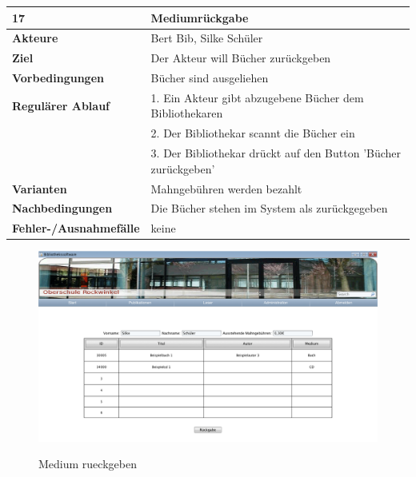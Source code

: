 \documentclass[fontsize=12pt,paper=a4,twoside]{scrartcl}
\begin{document}
\begin{table}[htbp]
\label{17}
\begin{tabular}{|l|p{10cm}|}
\hline 
\textbf{17} & \textbf{Mediumrückgabe} \\ \hline
\textbf{Akteure} & Bert Bib, Silke Schüler\\ \hline
\textbf{Ziel} & Der Akteur will Bücher zurückgeben \\ \hline
\textbf{Vorbedingungen} & Bücher sind ausgeliehen \\ \hline
\textbf{Regulärer Ablauf} & 
1. Ein Akteur gibt abzugebene Bücher dem Bibliothekaren \\
&2. Der Bibliothekar scannt die Bücher ein\\
&3. Der Bibliothekar drückt auf den Button 'Bücher zurückgeben'\\
\hline
\textbf{Varianten} & 
Mahngebühren werden bezahlt \\ \hline
\textbf{Nachbedingungen} & Die Bücher stehen im System als zurückgegeben\\ \hline
\textbf{Fehler-/Ausnahmefälle} & keine\\
\hline
\end{tabular}
\end{table}

\begin{figure}[htbp]
\caption{Medium rueckgeben}
\includegraphics[width=1\textwidth]{ScreensWebsite/Rueckgabe.png}
  \label{Medium rueckgeben}
\end{figure}
\end{document}
